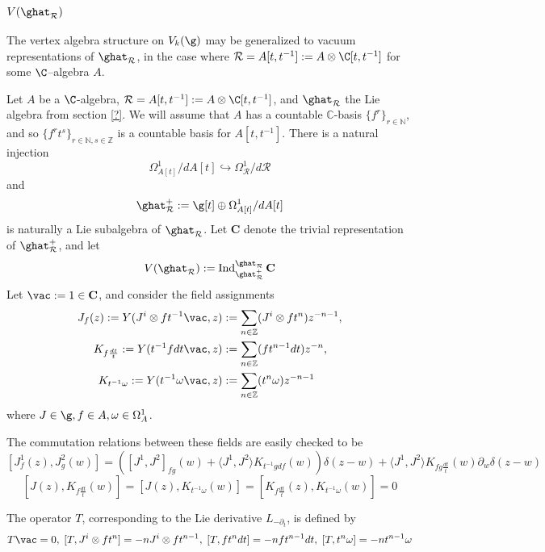 \documentclass[12pt]{amsart}
\theoremstyle{definition}
\theoremstyle{remark}
\newcommand{\on}{\operatorname}
\newcommand{\R}{\mathcal{R}}
\begin{document}
\subsubsection{$V(\ghat_{\R})$}

The vertex algebra structure on $V_{k}(\g)$ may be generalized to vacuum representations of $\ghat_{\R}$, in the case where $\R = A[t,t^{-1}] := A \otimes \C[t,t^{-1}]$ for some $\C$--algebra $A$. 


Let $A$ be a $\C$-algebra, $\R=A[t,t^{-1}] := A \otimes \C[t,t^{-1}]$, and $\ghat_{\R}$ the Lie algebra from section \ref{?}. We will assume that $A$ has a countable $\mathbb{C}$-basis $\{ f^r \}_{r \in \mathbb{N}}$, and so $\{ f^r t^s \}_{r \in \mathbb{N}, s \in \mathbb{Z}} $ is a countable basis for $A[t,t^{-1}]$. 
There is a natural injection
\[
\Omega^1_{A[t]}/ d A[t] \hookrightarrow \Omega^{1}_{\R} / d \R
\]
and 
$$\ghat^{+}_{\R} := \g[t] \oplus \Omega^1_{A[t]}/ d A[t]  $$ is naturally a Lie subalgebra of $\ghat_{\R}$. Let $\mathbf{C}$ denote the trivial representation of $\ghat^{+}_{\R}$, and let
\begin{equation}
V(\ghat_{\R}) := \on{Ind}^{\ghat_{\R}}_{\ghat^+_{\R}} \mathbf{C}
\end{equation}
Let $\vac := 1 \in \mathbf{C}$, and consider the field assignments
\begin{align}
J_f(z) := Y(J^{i} \otimes f t^{-1} \vac,z ) & := \sum_{n \in \mathbb{Z}} (J^i  \otimes f t^{n}) z^{-n-1}, \\
K_{f \frac{dt}{t}} :=  Y(t^{-1} f dt \vac,z ) & := \sum_{n \in \mathbb{Z}} ( f t^{n-1} dt )  z^{-n}, \\
K_{t^{-1} \omega} := Y(t^{-1}  \omega \vac,z ) & := \sum_{n \in \mathbb{Z}}( t^{n} \omega )    z^{-n-1} \\
\end{align}
where $J\in \g, f \in A, \omega \in \Omega^{1}_A$. 

The commutation relations between these fields are easily checked to be
$$
[J^1_f (z), J^2_g (w)] = \left( [J^1, J^2]_{fg} (w) + \langle J^1, J^2 \rangle  K_{t^{-1} g df} (w)      \right) \delta(z-w) + \langle J^1, J^2 \rangle K_{fg \frac{dt}{t}} (w) \partial_w \delta(z-w)
$$
$$
[J(z), K_{f \frac{dt}{t}}(w) ] = [J(z), K_{t^{-1} \omega} (w)] = [ K_{f \frac{dt}{t}}(z),  K_{t^{-1} \omega} (w)] =0
$$

The operator $T$, corresponding to the Lie derivative $L_{-\partial_t}$, is defined by
\[
T \vac =0, \; [T, J^i \otimes f t^n] = -n J^i \otimes f t^{n-1}, \; [T, f t^n dt] = -n f t^{n-1} dt, \; [T, t^n \omega] = -n t^{n-1} \omega
\]
\end{document}
